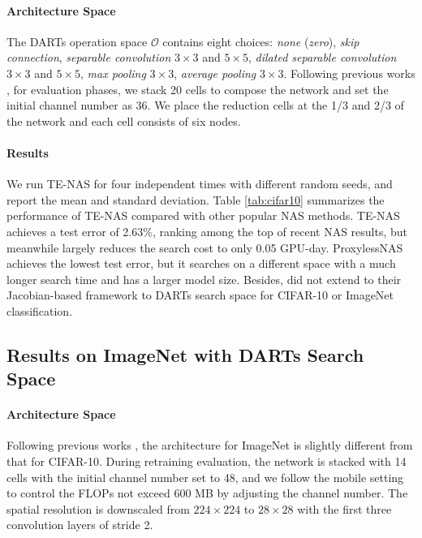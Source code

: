 \documentclass{article} \usepackage{iclr2021_conference,times}
\begin{document}
\paragraph{Architecture Space}
The DARTs operation space $\mathcal{O}$ contains eight choices: \textit{none} (\textit{zero}), \textit{skip connection}, \textit{separable convolution} $3\times 3 $ and $5\times 5$, \textit{dilated separable convolution} $3\times 3 $ and $5\times 5$, \textit{max pooling} $3\times 3 $, \textit{average pooling} $3\times 3 $.
Following previous works \citep{liu2018darts,chen2019progressive,xu2019pc}, for evaluation phases, we stack 20 cells to compose the network and set the initial channel number as 36. We place the reduction cells at the 1/3 and 2/3 of the network and each cell consists of six nodes.


\paragraph{Results}
We run TE-NAS for four independent times with different random seeds, and report the mean and standard deviation. Table \ref{tab:cifar10} summarizes the performance of TE-NAS compared with other popular NAS methods.
TE-NAS achieves a test error of 2.63\%, ranking among the top of recent NAS results, but meanwhile largely reduces the search cost to only 0.05 GPU-day.
ProxylessNAS achieves the lowest test error, but it searches on a different space with a much longer search time and has a larger model size. Besides, \citet{mellor2020neural} did not extend to their Jacobian-based framework to DARTs search space for CIFAR-10 or ImageNet classification.


\subsection{Results on ImageNet with DARTs Search Space}
\label{sec:imagenet}
\paragraph{Architecture Space}
Following previous works \citep{xu2019pc,chen2019progressive}, the architecture for ImageNet is slightly different from that for CIFAR-10. During retraining evaluation, the network is stacked with 14 cells with the initial channel number set to 48, and we follow the mobile setting to control the FLOPs not exceed 600 MB by adjusting the channel number.
The spatial resolution is downscaled from $224\times 224$ to $28\times 28$ with the first three convolution layers of stride 2.
\end{document}
